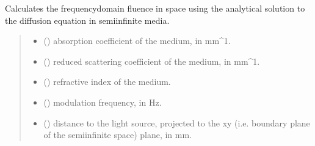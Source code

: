 \documentclass[letterpaper,10pt,english]{sphinxmanual}
\begin{document}
\begin{fulllineitems}
\label{\detokenize{_autosummary/nirfasterff.forward.analytical.semi_infinite_FD:nirfasterff.forward.analytical.semi_infinite_FD}}
\pysigstartsignatures
{}
\pysigstopsignatures
\sphinxAtStartPar
Calculates the frequency\sphinxhyphen{}domain fluence in space using the analytical solution to the diffusion equation in semi\sphinxhyphen{}infinite media.
\begin{quote}\begin{description}
\begin{itemize}
\item {} 
\sphinxAtStartPar
{} () \textendash{} absorption coefficient of the medium, in mm\textasciicircum{}\sphinxhyphen{}1.

\item {} 
\sphinxAtStartPar
{} () \textendash{} reduced scattering coefficient of the medium, in mm\textasciicircum{}\sphinxhyphen{}1.

\item {} 
\sphinxAtStartPar
{} () \textendash{} refractive index of the medium.

\item {} 
\sphinxAtStartPar
{} () \textendash{} modulation frequency, in Hz.

\item {} 
\sphinxAtStartPar
{} () \textendash{} 
\sphinxAtStartPar
distance to the light source, projected to the x\sphinxhyphen{}y (i.e. boundary plane of the semi\sphinxhyphen{}infinite space) plane, in mm.


\end{itemize}
\end{description}
\end{quote}
\end{fulllineitems}
\end{document}
